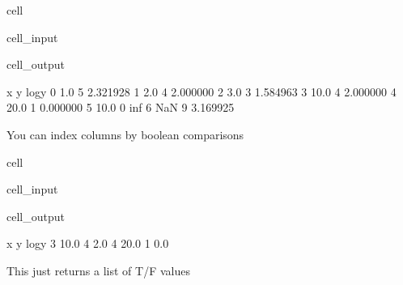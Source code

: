 \documentclass[letterpaper,10pt,english]{jupyterBook}
\begin{document}
\begin{sphinxuseclass}{cell}\begin{sphinxVerbatimInput}

\begin{sphinxuseclass}{cell_input}
\begin{sphinxVerbatim}[commandchars=\\\{\}]
\end{sphinxVerbatim}

\end{sphinxuseclass}\end{sphinxVerbatimInput}
\begin{sphinxVerbatimOutput}

\begin{sphinxuseclass}{cell_output}
\begin{sphinxVerbatim}[commandchars=\\\{\}]
      x  y     log\PYGZus{}y
0   1.0  5  2.321928
1   2.0  4  2.000000
2   3.0  3  1.584963
3  10.0  4  2.000000
4  20.0  1  0.000000
5 \PYGZhy{}10.0  0      \PYGZhy{}inf
6   NaN  9  3.169925
\end{sphinxVerbatim}

\end{sphinxuseclass}\end{sphinxVerbatimOutput}

\end{sphinxuseclass}
\sphinxAtStartPar
You can index columns by boolean comparisons

\begin{sphinxuseclass}{cell}\begin{sphinxVerbatimInput}

\begin{sphinxuseclass}{cell_input}
\begin{sphinxVerbatim}[commandchars=\\\{\}]
\PYG{p}{[}\PYG{p}{]}
\end{sphinxVerbatim}

\end{sphinxuseclass}\end{sphinxVerbatimInput}
\begin{sphinxVerbatimOutput}

\begin{sphinxuseclass}{cell_output}
\begin{sphinxVerbatim}[commandchars=\\\{\}]
      x  y  log\PYGZus{}y
3  10.0  4    2.0
4  20.0  1    0.0
\end{sphinxVerbatim}

\end{sphinxuseclass}\end{sphinxVerbatimOutput}

\end{sphinxuseclass}
\sphinxAtStartPar
This just returns a list of T/F values
\end{document}
